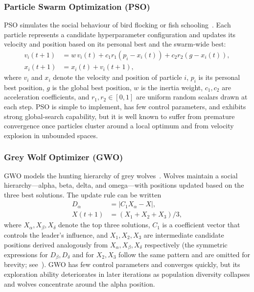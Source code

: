 \documentclass[letterpaper, 10 pt, conference]{ieeeconf}
\begin{document}
\subsubsection{Particle Swarm Optimization (PSO)}

PSO simulates the social behaviour of bird flocking or fish schooling~\cite{rehan2022, kennedy1995}. Each particle represents a candidate hyperparameter configuration and updates its velocity and position based on its personal best and the swarm-wide best:
\begin{align}
	v_i(t+1) &= w\,v_i(t) + c_1 r_1 (p_i - x_i(t)) + c_2 r_2 (g - x_i(t)), \\
	x_i(t+1) &= x_i(t) + v_i(t+1),
\end{align}
where $v_i$ and $x_i$ denote the velocity and position of particle $i$, $p_i$ is its personal best position, $g$ is the global best position, $w$ is the inertia weight, $c_1, c_2$ are acceleration coefficients, and $r_1, r_2 \in [0,1]$ are uniform random scalars drawn at each step. PSO is simple to implement, has few control parameters, and exhibits strong global-search capability, but it is well known to suffer from premature convergence once particles cluster around a local optimum and from velocity explosion in unbounded spaces.

\subsubsection{Grey Wolf Optimizer (GWO)}

GWO models the hunting hierarchy of grey wolves~\cite{huo2022, mirjalili2014}. Wolves maintain a social hierarchy---alpha, beta, delta, and omega---with positions updated based on the three best solutions. The update rule can be written
\begin{align}
	D_{\alpha} &= |C_1 X_{\alpha} - X|, \\
	X(t+1) &= (X_1 + X_2 + X_3)/3,
\end{align}
where $X_{\alpha}, X_{\beta}, X_{\delta}$ denote the top three solutions, $C_1$ is a coefficient vector that controls the leader's influence, and $X_1, X_2, X_3$ are intermediate candidate positions derived analogously from $X_{\alpha}, X_{\beta}, X_{\delta}$ respectively (the symmetric expressions for $D_{\beta}, D_{\delta}$ and for $X_2, X_3$ follow the same pattern and are omitted for brevity; see~\cite{mirjalili2014}). GWO has few control parameters and converges quickly, but its exploration ability deteriorates in later iterations as population diversity collapses and wolves concentrate around the alpha position.
\end{document}
